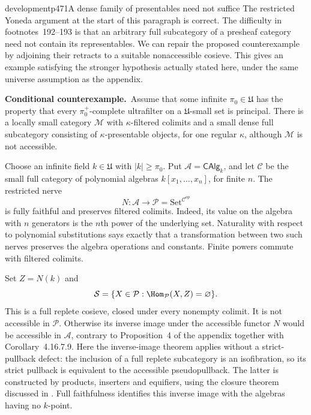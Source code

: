 \begin{dcomment}{development}{p471}{A dense family of presentables need not suffice}
The restricted Yoneda argument at the start of this paragraph is correct. The difficulty in footnotes~192--193 is that an arbitrary full subcategory of a presheaf category need not contain its representables. We can repair the proposed counterexample by adjoining their retracts to a suitable nonaccessible cosieve. This gives an example satisfying the stronger hypothesis actually stated here, under the same universe assumption as the appendix.

\textbf{Conditional counterexample.}\ours\
Assume that some infinite $\pi_0\in\mathfrak U$ has the property that every $\pi_0^+$-complete ultrafilter on a $\mathfrak U$-small set is principal. There is a locally small category $\mathcal M$ with $\kappa$-filtered colimits and a small dense full subcategory consisting of $\kappa$-presentable objects, for one regular $\kappa$, although $\mathcal M$ is not accessible.

Choose an infinite field $k\in\mathfrak U$ with $|k|\ge\pi_0$. Put $\mathcal A=\mathsf{CAlg}_k$, and let $\mathcal C$ be the small full category of polynomial algebras $k[x_1,\ldots,x_n]$, for finite $n$. The restricted nerve
\[
 N:\mathcal A\longrightarrow\mathcal P=\mathrm{Set}^{\mathcal C^{op}}
\]
is fully faithful and preserves filtered colimits. Indeed, its value on the algebra with $n$ generators is the $n$th power of the underlying set. Naturality with respect to polynomial substitutions says exactly that a transformation between two such nerves preserves the algebra operations and constants. Finite powers commute with filtered colimits.

Set $Z=N(k)$ and
\[
 \mathcal S=\{X\in\mathcal P:\Hom_{\mathcal P}(X,Z)=\varnothing\}.
\]
This is a full replete cosieve, closed under every nonempty colimit. It is not accessible in $\mathcal P$. Otherwise its inverse image under the accessible functor $N$ would be accessible in $\mathcal A$, contrary to Proposition~4 of the appendix together with Corollary~4.16.7.9. Here the inverse-image theorem applies without a strict-pullback defect: the inclusion of a full replete subcategory is an isofibration, so its strict pullback is equivalent to the accessible pseudopullback. The latter is constructed by products, inserters and equifiers, using the closure theorem discussed in \citet[Appendix~A]{ChingRiehl2014}. Full faithfulness identifies this inverse image with the algebras having no $k$-point.


\end{dcomment}
